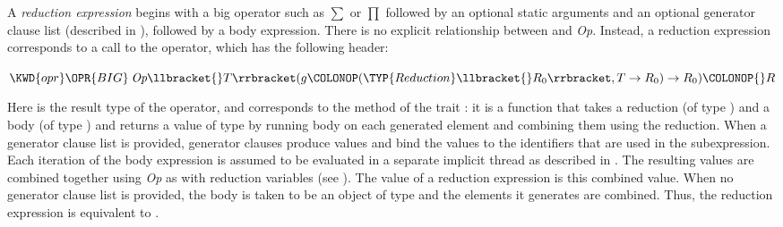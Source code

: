 A \emph{reduction expression} begins with a big operator such as
$\sum$ or $\prod$ followed by an optional static arguments and
an optional generator clause list (described in
), followed by a body expression.
There is no explicit relationship between  and
\emph{Op}.  Instead, a reduction expression corresponds to a call to the
 operator, which has the following header:
\begin{Fortress}
\(\KWD{opr} \mathord{\OPR{BIG}}\: \emph{Op}\llbracket{}T\rrbracket(g\COLONOP(\TYP{Reduction}\llbracket{}R_{0}\rrbracket,T\rightarrow{}R_{0})\rightarrow{}R_{0})\COLONOP{}R\)
\end{Fortress}
Here  is the result type of the operator, and  corresponds to
the method %
of the trait %
:
it is a function that takes a reduction (of type %
)
and a body (of type )
and returns a value of type  by running body on each
generated element and combining them using the reduction.
When a generator clause
list is provided, generator clauses produce values and bind the values to the
identifiers that are used in the subexpression.  Each iteration of the
body expression is assumed to be evaluated in a separate implicit
thread as described in .  The resulting values are
combined together using \emph{Op}
\label{redexpr-redvar}
as with reduction variables (see ).
The value of a reduction expression is this combined value.
When no generator clause list is provided, the body is taken to be an
object of type  and the elements it generates are
combined.  Thus, the reduction expression  is equivalent
to .

